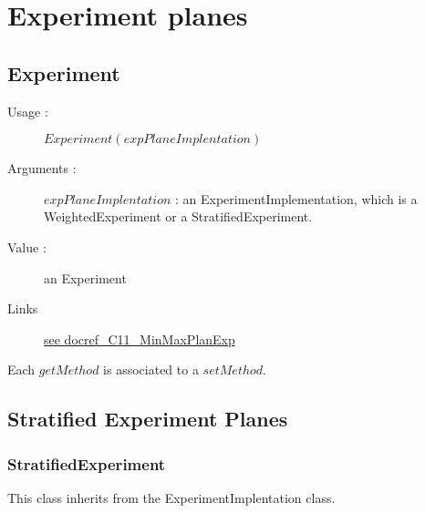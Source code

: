 
\newpage \section{Experiment planes}

\subsection{Experiment}

\begin{description}

\item[Usage :] $Experiment(expPlaneImplentation)$

\item[Arguments :]  $expPlaneImplentation$ : an ExperimentImplementation, which is a WeightedExperiment or a StratifiedExperiment.

\item[Value :] an Experiment

\item[Links]  \rule{0pt}{1em}
  \href{./Version/docref_C11_MinMaxPlanExp.pdf}{see docref\_C11\_MinMaxPlanExp}

\end{description}

Each  $getMethod$  is associated to a $setMethod$.



\newpage        \subsection{Stratified Experiment Planes}


\subsubsection{StratifiedExperiment}

This class inherits from the ExperimentImplentation class.\\

